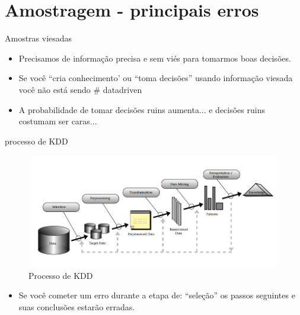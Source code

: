 \section{Amostragem - principais erros}

\begin{frame}	
	\begin{block}{Amostras viesadas}	
		\begin{itemize}
			\item Precisamos de informação precisa e sem viés para tomarmos boas decisões.
			\item Se você ``cria conhecimento' ou ``toma decisões'' usando informação viesada você não está sendo \# datadriven
			\item A probabilidade de tomar decisões ruins aumenta... e decisões ruins costumam ser caras...
		\end{itemize}		
	\end{block}
\end{frame}

\begin{frame}	
	\begin{block}{processo de KDD}	
		\begin{figure}[!htb]
			\centering	  				
			\includegraphics[height=5cm, width = 12cm]{./pic/kddprocess.jpg}
			\caption{Processo de KDD}
			\label{fig_kdd_process}
		\end{figure}
		\begin{itemize}
			\item Se você cometer um erro durante a etapa de: ``seleção'' os passos seguintes e suas conclusões estarão erradas.
		\end{itemize}
	\end{block}
\end{frame}

